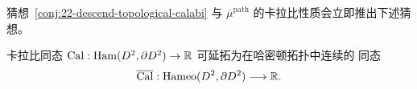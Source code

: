 猜想~\ref{conj:22-descend-topological-calabi} 与
$\overline\mu^{\mathrm{path}}$ 的卡拉比性质会立即推出下述猜想。

\begin{conjecture}
\label{conj:22-calabi-homeomorphism-extension}
卡拉比同态
$\operatorname{Cal}:\operatorname{Ham}(D^2,\partial D^2)\to\mathbb R$ 可延拓为在哈密顿拓扑中连续的
同态
\[
 \overline{\operatorname{Cal}}:
 \operatorname{Hameo}(D^2,\partial D^2)\longrightarrow\mathbb R.
\]
\end{conjecture}
